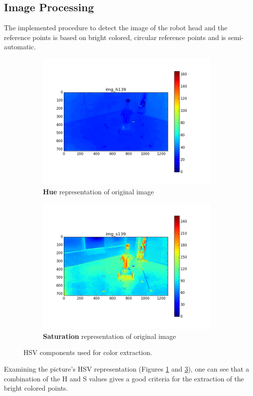 \subsection{Image Processing}
\label{sec:imageprocessing}

The implemented procedure to detect the image of the robot head and the reference points is based on bright colored, circular reference points and is semi-automatic.

\begin{figure}[htb]
	\begin{subfigure}[b]{0.49\linewidth}
        \centering
		\includegraphics[width=\linewidth]{files/_img_h139.png}
		\caption{\textbf{Hue} representation of original image}
		\label{fig:img_h}
	\end{subfigure}
	\begin{subfigure}[b]{0.49\linewidth}
        \centering
		\includegraphics[width=\linewidth]{files/_img_s139.png}
		\caption{\textbf{Saturation} representation of original image}
		\label{fig:img_s}
	\end{subfigure}
    \caption{HSV components used for color extraction.}
\end{figure}
Examining the picture's HSV representation (Figures \ref{fig:img_h} and \ref{fig:img_s}), one can see that a combination of the H and S values gives a good criteria for the extraction of the bright colored points. 

